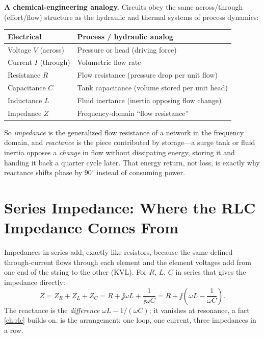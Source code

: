 \begin{physicalbox}
\textbf{A chemical-engineering analogy.} Circuits obey the same
across/through (effort/flow) structure as the hydraulic and thermal systems of
process dynamics:
\begin{center}
\begin{tabularx}{0.92\textwidth}{@{}L{0.26\textwidth}Y@{}}
\toprule
Electrical & Process / hydraulic analog \\
\midrule
Voltage \(V\) (across) & Pressure or head (driving force) \\
Current \(I\) (through) & Volumetric flow rate \\
Resistance \(R\) & Flow resistance (pressure drop per unit flow) \\
Capacitance \(C\) & Tank capacitance (volume stored per unit head) \\
Inductance \(L\) & Fluid inertance (inertia opposing flow change) \\
Impedance \(Z\) & Frequency-domain ``flow resistance'' \\
\bottomrule
\end{tabularx}
\end{center}
So \emph{impedance} is the generalized flow resistance of a network in the
frequency domain, and \emph{reactance} is the piece contributed by storage---a
surge tank or fluid inertia opposes a \emph{change} in flow without dissipating
energy, storing it and handing it back a quarter cycle later. That energy return,
not loss, is exactly why reactance shifts phase by \(90^\circ\) instead of
consuming power.
\end{physicalbox}

\section{Series Impedance: Where the RLC Impedance Comes From}
Impedances in series add, exactly like resistors, because the same defined
through-current flows through each element and the element voltages add from one
end of the string to the other (KVL). For \(R\), \(L\), \(C\) in series that gives
the impedance directly:
\[
Z=Z_R+Z_L+Z_C=R+\jj\omega L+\frac{1}{\jj\omega C}
=R+\jj\left(\omega L-\frac{1}{\omega C}\right).
\]
\cite[pp.~28--29]{white2004highfrequency}
The reactance is the \emph{difference} \(\omega L-1/(\omega C)\); it vanishes at
resonance, a fact \cref{ch:rlc} builds on.  is the arrangement:
one loop, one current, three impedances in a row.


